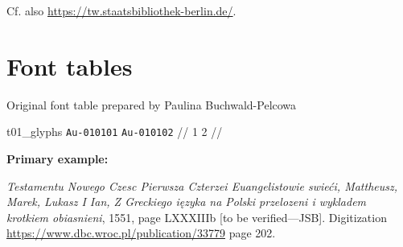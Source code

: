 \documentclass{article}
\newcommand{\bg}{\begingl}
\newcommand{\PTglyph}[2]{\texttt{[image: glyphs/\#2]}}
\begin{document}
\noindent
Cf. also \url{https://tw.staatsbibliothek-berlin.de/}.

\newpage
\section{Font tables}
\label{sec:font-tables}


%
  \begin{flushleft}
    \label{fig:t01}

    \medskip
    
      Original font table prepared by Paulina Buchwald-Pelcowa

 {t01_glyphs}
\glpismo
\texttt{Au-010101}
\texttt{Au-010102}
//
\glnr
{\small 1}
{\small 2}
//
\endgl \xe

\end{flushleft}



  \textbf{Primary example:}

  \textit{Testamentu Nowego Czesc Pierwsza Czterzei Euangelistowie
    swieći, Mattheusz, Marek, Lukasz I Ian, Z Greckiego ięzyka na
    Polski przelozeni i wykladem krotkiem obiasnieni}, 1551, page
  LXXXIIIb [to be verified---JSB].  Digitization
  \url{https://www.dbc.wroc.pl/publication/33779} page 202.

\end{document}
